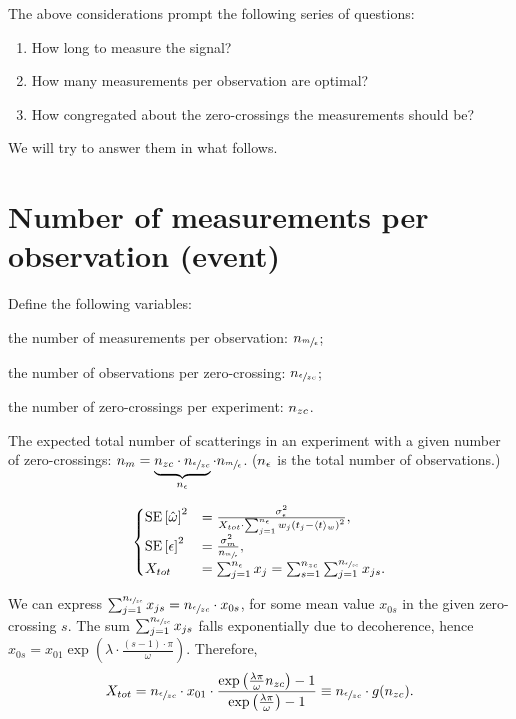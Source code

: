 \documentclass{article}
\begin{document}
The above considerations prompt the following series of questions:
\begin{enumerate}
	\item How long to measure the signal?
	\item How many measurements per observation are optimal?
	\item How congregated about the zero-crossings the measurements should be?
\end{enumerate}
We will try to answer them in what follows.

\section{Number of measurements per observation (event)}

Define the following variables: \begin{inparaenum}
	\item the number of measurements per observation: $n_{\sfrac{m}{\epsilon}}$;
	\item the number of observations per zero-crossing: $n_{\sfrac{\epsilon}{zc}}$;
	\item the number of zero-crossings per experiment: $n_{zc}$.
\end{inparaenum}

The expected total number of scatterings in an experiment with a given number of zero-crossings: $n_m = \underbrace{n_{zc}\cdot n_{\sfrac{\epsilon}{zc}}}_{n_{\epsilon}}\cdot n_{\sfrac{m}{\epsilon}}$. ($n_{\epsilon}$ is the total number of observations.)

\begin{equation}
\begin{cases}
	\SE{\hat{\omega}}^2 &= \frac{\SD{\obs}^2}{X_{tot}\cdot\sum_{j=1}^{\No}w_j\bkt{t_j - \avg{t}_w}^2}, \\
	\SE{\obs}^2 &= \frac{\SD{\meas}^2}{\Nmo} ,\\
	X_{tot} &= \sum_{j=1}^{\No} x_j = \sum_{s=1}^{\Nzc}\sum_{j=1}^{\Nozc} x_{js}.
\end{cases}
\end{equation}

We can express $\sum_{j=1}^{n_{\sfrac{\epsilon}{zc}}} x_{js} = n_{\sfrac{\epsilon}{zc}} \cdot x_{0s}$, for some mean value $x_{0s}$ in the given zero-crossing $s$. The sum $\sum_{j=1}^{n_{\sfrac{\epsilon}{zc}}} x_{js}$ falls exponentially due to decoherence, hence $x_{0s} = x_{01}\exp{(\lambda\cdot \frac{(s-1)\cdot\pi}{\omega})}$. Therefore,
\[
	X_{tot} = \Nozc\cdot x_{01} \cdot \frac{\exp{\bkt{\frac{\lambda\pi}{\omega}\Nzc}}-1}{\exp{\bkt{\frac{\lambda\pi}{\omega}}}-1} \equiv \Nozc \cdot g(\Nzc).
\]
\end{document}
